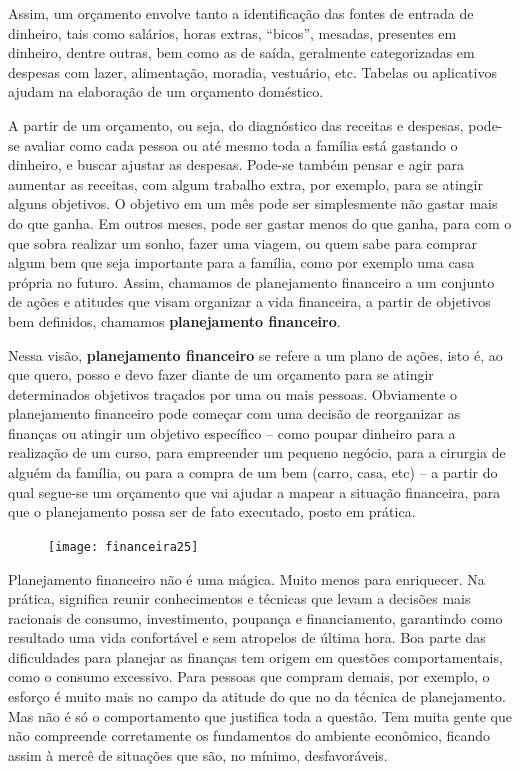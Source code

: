Assim, um orçamento envolve tanto a identificação das fontes de entrada de dinheiro, tais como salários, horas extras, “bicos”, mesadas, presentes em dinheiro, dentre outras, bem como as de saída, geralmente categorizadas em despesas com lazer, alimentação, moradia, vestuário, etc. Tabelas ou aplicativos ajudam na elaboração de um orçamento doméstico.

A partir de um orçamento, ou seja, do diagnóstico das receitas e despesas, pode-se avaliar como cada pessoa ou até mesmo toda a família está gastando o dinheiro, e buscar ajustar as despesas. Pode-se também pensar e agir para aumentar as receitas, com algum trabalho extra, por exemplo, para se atingir alguns objetivos. O objetivo em um mês pode ser simplesmente não gastar mais do que ganha. Em outros meses, pode ser gastar menos do que ganha, para com o que sobra realizar um sonho, fazer uma viagem, ou quem sabe para comprar algum bem que seja importante para a família, como por exemplo uma casa própria no futuro. Assim, chamamos de planejamento financeiro a um conjunto de ações e atitudes que visam organizar a vida financeira, a partir de objetivos bem definidos, chamamos \textbf{planejamento financeiro}. 

Nessa visão, \textbf{planejamento financeiro} se refere a um plano de ações, isto é, ao que quero, posso e devo fazer diante de um orçamento para se atingir determinados objetivos traçados por uma ou mais pessoas. Obviamente o planejamento financeiro pode começar com uma decisão de reorganizar as finanças ou atingir um objetivo específico – como poupar dinheiro para a realização de um curso, para empreender um pequeno negócio, para a cirurgia de alguém da família, ou para a compra de um bem (carro, casa, etc) – a partir do qual segue-se um orçamento que vai ajudar a mapear a situação financeira, para que o planejamento possa ser de fato executado, posto em prática.

\vspace{-.75em}
\begin{knowledge}

\begin{figure}
\vspace{-1em}
\texttt{[image: financeira25]}
\end{figure}
Planejamento financeiro não é uma mágica. Muito menos para enriquecer. Na prática, significa reunir conhecimentos e técnicas que levam a decisões mais racionais de consumo, investimento, poupança e financiamento, garantindo como resultado uma vida confortável e sem atropelos de última hora. Boa parte das dificuldades para planejar as finanças tem origem em questões comportamentais, como o consumo excessivo. Para pessoas que compram demais, por exemplo, o esforço é muito mais no campo da atitude do que no da técnica de planejamento. Mas não é só o comportamento que justifica toda a questão. Tem muita gente que não compreende corretamente os fundamentos do ambiente econômico, ficando assim à mercê de situações que são, no mínimo, desfavoráveis.
\end{knowledge}
\vspace{-.5em}

